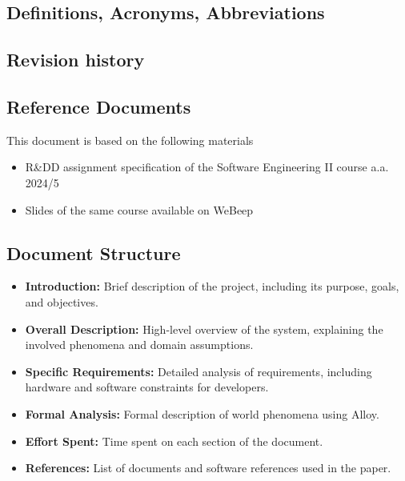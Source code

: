 \subsection{Definitions, Acronyms, Abbreviations}
\subsection{Revision history}
\subsection{Reference Documents}
This document is based on the following materials
\begin{itemize}
    \item R\&DD assignment specification of the Software Engineering II course a.a. 2024/5
    \item Slides of the same course available on WeBeep
\end{itemize}


\subsection{Document Structure}
\begin{itemize}
  \item \textbf{Introduction:} Brief description of the project, including its purpose, goals, and objectives.
  \item \textbf{Overall Description:} High-level overview of the system, explaining the involved phenomena and domain assumptions.
  \item \textbf{Specific Requirements:} Detailed analysis of requirements, including hardware and software constraints for developers.
  \item \textbf{Formal Analysis:} Formal description of world phenomena using Alloy.
  \item \textbf{Effort Spent:} Time spent on each section of the document.
  \item \textbf{References:} List of documents and software references used in the paper.
\end{itemize}
